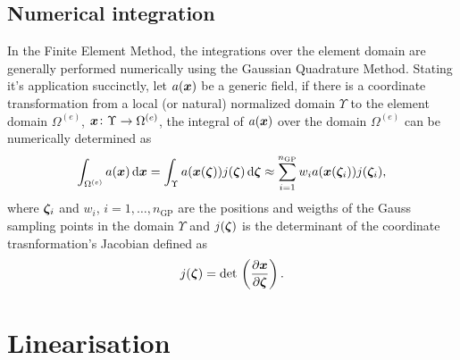\subsection{Numerical integration} \label{sec:numerical_integration}

In the Finite Element Method, the integrations over the element domain are generally performed numerically using the Gaussian Quadrature Method.
Stating it's application succinctly, let $a(\bm{x})$ be a generic field, if there is a coordinate transformation from a local (or natural) normalized domain $\Upsilon$ to the element domain $\Omega^{(e)}$, $\bm{x}\colon \Upsilon \to \Omega^{(e)}$, the integral of $a(\bm{x})$ over the domain $\Omega^{(e)}$ can be numerically determined as
\begin{equation}
    \int_{\Omega^{(e)} } a(\bm{x})\,\mathrm{d} \bm{x} = \int_\Upsilon a(\bm{x}(\bm{\zeta}))j(\bm{\zeta})\,\mathrm{d} \bm{\zeta} \approx \sum_{i=1}^{n_\text{GP}} w_i a(\bm{x}(\bm{\zeta}_i))j(\bm{\zeta}_i),
\end{equation}
where $\bm{\zeta}_i$ and $w_i$, $i=1,\dots,n_\text{GP}$ are the positions and weigths of the Gauss sampling points in the domain $\Upsilon$ and $j(\bm{\zeta})$ is the determinant of the coordinate trasnformation's Jacobian defined as
\begin{equation}
    j(\bm{\zeta}) = \text{det}\,\left(\frac{\partial \bm{x}}{\partial \bm{\zeta}}\right).
\end{equation}


\section{Linearisation}

